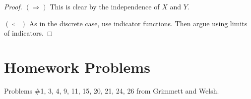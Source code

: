 \begin{proof}
  $(\Rightarrow)$ This is clear by the independence
  of $X$ and $Y$.

  $(\Leftarrow)$ As in the discrete case, use
  indicator functions. Then argue using limits
  of indicators.
\end{proof}

\section{Homework Problems}
Problems \#1, 3, 4, 9, 11, 15, 20, 21, 24, 26
from Grimmett and Welsh.
